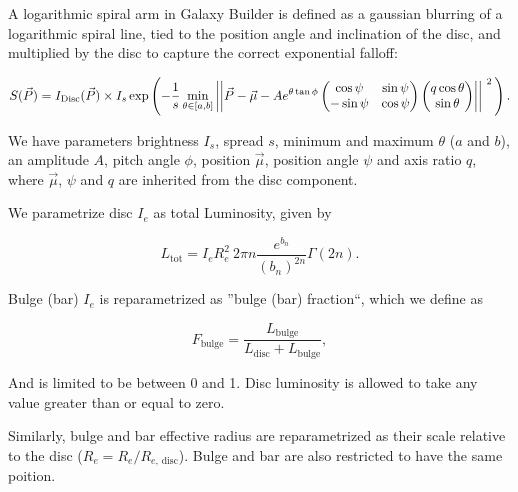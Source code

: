 \documentclass[../main.tex]{subfiles}
\begin{document}
A logarithmic spiral arm in Galaxy Builder is defined as a gaussian blurring of a logarithmic spiral line, tied to the position angle and inclination of the disc, and multiplied by the disc to capture the correct exponential falloff:

\begin{equation}
S(\vec{P}) = I_\mathrm{Disc}(\vec{P}) \times I_s\exp\left(
  -\frac{1}{s}\min_{\theta\in[a, b]}\left|\left|\vec{P} - \vec\mu - Ae^{\theta\tan\phi}\begin{pmatrix}
       \cos\psi & \sin\psi\\
       -\sin\psi & \cos\psi
       \end{pmatrix}
       \begin{pmatrix}
       q\cos\theta \\
       \sin\theta \\
       \end{pmatrix}
       \right|\right|^{\ 2}\\
    \right).
\end{equation}

We have parameters brightness $I_s$, spread $s$, minimum and maximum $\theta$ ($a$ and $b$), an amplitude $A$, pitch angle $\phi$, position $\vec\mu$, position angle $\psi$ and axis ratio $q$, where $\vec\mu$, $\psi$ and $q$ are inherited from the disc component.

We parametrize disc $I_e$ as total Luminosity, given by

\begin{equation}
L_\mathrm{tot} = I_eR_e^2\ 2\pi n\frac{e^{b_n}}{(b_n)^{2n}}\Gamma(2n).
\end{equation}

Bulge (bar) $I_e$ is reparametrized as ''bulge (bar) fraction``, which we define as

\begin{equation}
F_\mathrm{bulge} = \frac{L_\mathrm{bulge}}{L_\mathrm{disc} + L_\mathrm{bulge}},
\end{equation}


And is limited to be between 0 and 1. Disc luminosity is allowed to take any value greater than or equal to zero.

Similarly, bulge and bar effective radius are reparametrized as their scale relative to the disc ($R_e = R_e / R_{e,\,\mathrm{disc}}$). Bulge and bar are also restricted to have the same poition.
\end{document}
